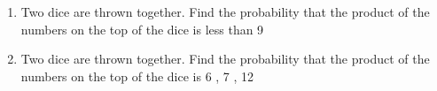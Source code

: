 \begin{enumerate}[label=\thechapter.\arabic*,ref=\thechapter.\theenumi]
\solution
\\

\item
Two dice are thrown together. Find the probability that the product of the numbers on the top of the dice is less than 9\\
\solution

\item Two dice are thrown together. Find the probability that the product of the numbers on the top of the dice is 6 , 7 , 12 \\
\solution

\end{enumerate}
 
